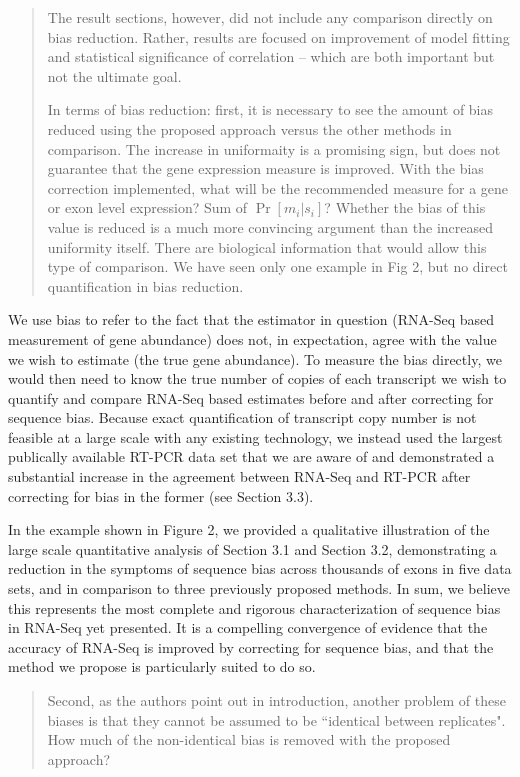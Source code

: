 \documentclass{article}
\begin{document}
\begin{quote}
The result sections, however, did not include any comparison directly
on bias reduction. Rather, results are focused on improvement of model
fitting and statistical significance of correlation -- which are both
important but not the ultimate goal.

In terms of bias reduction: first, it is necessary to see the amount of bias
reduced using the proposed approach versus the other methods in
comparison.  The increase in uniformaity is a promising sign, but does
not guarantee that the gene expression measure is improved.  With the
bias correction implemented, what will be the recommended measure for
a gene or exon level expression? Sum of $\Pr[m_i|s_i]$? Whether the bias of
this value is reduced is a much more convincing argument than the
increased uniformity itself. There are  biological information that
would allow this type of comparison. We have seen only one example in
Fig 2, but no direct quantification in bias reduction.
\end{quote}

We use bias to refer to the fact that the estimator in question (RNA-Seq
based measurement of gene abundance) does not, in expectation, agree with the
value we wish to estimate (the true gene abundance). To measure the bias
directly, we would then need to know the true number of copies of each
transcript we wish to quantify and compare RNA-Seq based estimates before and
after correcting for sequence bias. Because exact quantification of transcript
copy number is not feasible at a large scale with any existing technology, we
instead used the largest publically available RT-PCR data set that we are aware
of and demonstrated a substantial increase in the agreement between RNA-Seq and
RT-PCR after correcting for bias in the former (see Section 3.3).

In the example shown in Figure 2, we provided a qualitative illustration of the
large scale quantitative analysis of Section 3.1 and Section 3.2, demonstrating
a reduction in the symptoms of sequence bias across thousands of exons in five
data sets, and in comparison to three previously proposed methods. In sum, we
believe this represents the most complete and rigorous characterization of
sequence bias in RNA-Seq yet presented. It is a compelling convergence of
evidence that the accuracy of RNA-Seq is improved by correcting for sequence
bias, and that the method we propose is particularly suited to do so.


\begin{quote}
Second, as the authors point out in introduction, another problem of
these biases is that they cannot be assumed to be ``identical between
replicates". How much of the non-identical bias is removed with the
proposed approach?
\end{quote}
\end{document}
